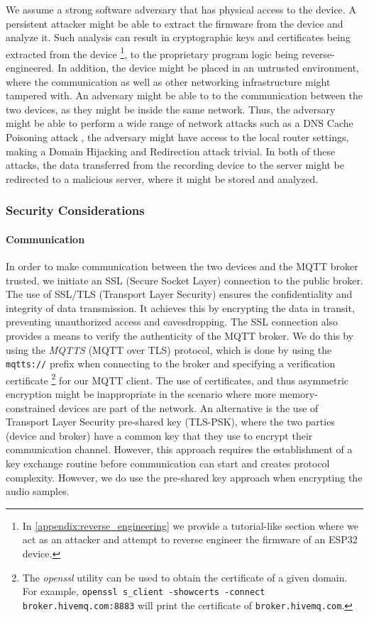 \documentclass[conference]{IEEEtran}
\begin{document}
We assume a strong software adversary that has physical access to the device.
A persistent attacker might be able to extract the firmware from the device and
analyze it. Such analysis can result in cryptographic keys and certificates being extracted from the device
\footnote{In \cref{appendix:reverse_engineering} we provide a tutorial-like section where we act as an attacker and attempt to reverse engineer the firmware of an ESP32 device.}, 
to the proprietary program logic being reverse-engineered.
In addition, the device might be placed in an untrusted environment, where the communication as well 
as other networking infrastructure might tampered with.
An adversary might be able to  to the communication between the two devices,
as they might be inside the same network.
Thus, the adversary might be able to perform a wide range of network attacks such 
as a DNS Cache Poisoning attack \cite{Dissanayake_2018}, the adversary might have access to the local router 
settings, making a Domain Hijacking and Redirection attack \cite{DnsHijacking} trivial. In both of these attacks, 
the data transferred from the recording device to the server might be redirected to a malicious server, 
where it might be stored and analyzed.

\subsubsection{Security Considerations}

\paragraph{Communication}

In order to make communication between the two devices and the MQTT broker
trusted, we initiate an SSL (Secure Socket Layer) connection to the public broker. 
The use of SSL/TLS (Transport Layer Security)
ensures the confidentiality and integrity of data transmission. 
It achieves this by encrypting the data in transit, preventing
unauthorized access and eavesdropping. The SSL connection also provides a means
to verify the authenticity of the MQTT broker.
We do this by using the \textit{MQTTS} (MQTT over TLS) protocol, which is done 
by using the \texttt{mqtts://} prefix when connecting to the broker and specifying 
a verification certificate
\footnote{The \textit{openssl} utility can be used to obtain the certificate of a given domain.
For example, \texttt{openssl s\_client -showcerts -connect broker.hivemq.com:8883} will print the certificate of \texttt{broker.hivemq.com}.}
for our MQTT client.
The use of certificates, and thus asymmetric encryption might be inappropriate in the scenario where more 
memory-constrained devices are part of the network. 
An alternative is the use of Transport Layer Security pre-shared key (TLS-PSK)\cite{rfc4279}, where the two parties 
(device and broker) have a common key that they use to encrypt their communication channel.
However, this approach requires the establishment of a key exchange routine before communication can start
and creates protocol complexity.
However, we do use the pre-shared key approach when encrypting the audio samples.
\end{document}
